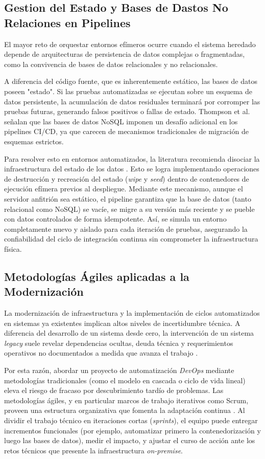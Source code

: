 \subsection{Gestion del Estado y Bases de Dastos No Relaciones en Pipelines}
El mayor reto de orquestar entornos efímeros ocurre cuando el sistema heredado depende de 
arquitecturas de persistencia de datos complejas o fragmentadas, como la convivencia de 
bases de datos relacionales y no relacionales. 

A diferencia del código fuente, que es inherentemente estático, las bases de datos poseen "estado". 
Si las pruebas automatizadas se ejecutan sobre un esquema de datos persistente, la acumulación de datos 
residuales terminará por corromper las pruebas futuras, generando falsos positivos o fallas de estado. 
Thompson et al. \cite{Thompson2021} señalan que las bases de datos NoSQL imponen un desafío adicional 
en los pipelines CI/CD, ya que carecen de mecanismos tradicionales de migración de esquemas estrictos.

Para resolver esto en entornos automatizados, la literatura recomienda disociar la infraestructura del 
estado de los datos \cite{Martin2022}. Esto se logra implementando operaciones de destrucción y recreación 
del estado (\emph{wipe} y \emph{seed}) dentro de contenedores de ejecución efímera previos al despliegue. 
Mediante este mecanismo, aunque el servidor anfitrión sea estático, el pipeline garantiza que la base de 
datos (tanto relacional como NoSQL) se vacíe, se migre a su versión más reciente y se pueble con datos 
controlados de forma idempotente. Así, se simula un entorno completamente nuevo y aislado para cada 
iteración de pruebas, asegurando la confiabilidad del ciclo de integración continua sin comprometer 
la infraestructura física. 

\subsection{Metodologías Ágiles aplicadas a la Modernización}
La modernización de infraestructura y la implementación de ciclos automatizados en sistemas ya existentes 
implican altos niveles de incertidumbre técnica. A diferencia del desarrollo de un sistema desde cero, 
la intervención de un sistema \emph{legacy} suele revelar dependencias ocultas, deuda técnica y 
requerimientos operativos no documentados a medida que avanza el trabajo \cite{Vargas2021}.

Por esta razón, abordar un proyecto de automatización \emph{DevOps} mediante metodologías tradicionales 
(como el modelo en cascada o ciclo de vida lineal) eleva el riesgo de fracaso por descubrimiento 
tardío de problemas. Las metodologías ágiles, y en particular marcos de trabajo iterativos como 
Scrum, proveen una estructura organizativa que fomenta la adaptación continua \cite{Vargas2021}. 
Al dividir el trabajo técnico en iteraciones cortas (\emph{sprints}), el equipo puede entregar 
incrementos funcionales (por ejemplo, automatizar primero la contenedorización y luego las bases de datos), 
medir el impacto, y ajustar el curso de acción ante los retos técnicos que presente la infraestructura \emph{on-premise}.